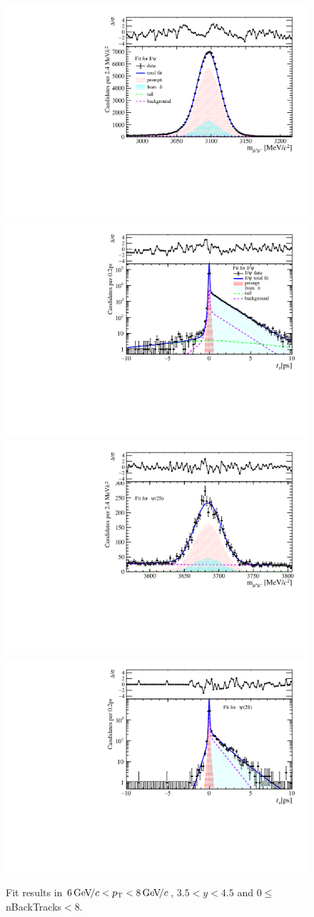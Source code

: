 \begin{figure}[H]
\begin{center}
\includegraphics[width=0.47\linewidth]{pdf/Jpsi/drawmassB/n1y3pt4.pdf}
\includegraphics[width=0.47\linewidth]{pdf/Jpsi/2DFitB/n1y3pt4.pdf}
\vspace*{-0.5cm}
\includegraphics[width=0.47\linewidth]{pdf/Psi2S/drawmassB/n1y3pt4.pdf}
\includegraphics[width=0.47\linewidth]{pdf/Psi2S/2DFitB/n1y3pt4.pdf}
\vspace*{-0.5cm}
\end{center}
\caption{Fit results in $6\text{\,Ge\kern -0.1em V\!/}c<p_{\mathrm{T}}<8\text{\,Ge\kern -0.1em V\!/}c$, $3.5<y<4.5$ and 0$\leq$nBackTracks$<$8.}
\label{Fitn1y3pt4}
\end{figure}
